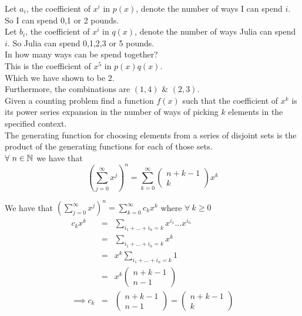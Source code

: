 \documentclass[11pt,a4paper]{article}
\begin{document}
Let $a_i$, the coefficient of $x^i$ in $p(x)$, denote the number of ways I can spend \textsterling$i$. So I can spend 0,1 or 2 pounds.\\
Let $b_i$, the coefficient of $x^i$ in $q(x)$, denote the number of ways Julia can spend \textsterling$i$. So Julia can spend 0,1,2,3 or 5 pounds.\\
In how many ways can be spend  together?\\
This is the coefficient of $x^5$ in $p(x)q(x)$.\\
Which we have shown to be $2$.\\
Furthermore, the combinations are $(1,4)$ \& $(2,3)$.\\

Given a counting problem find a function $f(x)$ such that the coefficient of $x^k$ is its power series expansion in the number of ways of picking $k$ elements in the specified context.\\
\nb The generating function for choosing elements from a series of disjoint sets is the product of the generating functions for each of those sets.\\

$\forall\ n\in\mathbb{N}$ we have that
$$\left(\sum_{j=0}^\infty x^j\right)^n=\sum_{k=0}^\infty\begin{pmatrix}n+k-1\\k\end{pmatrix}x^k$$

We have that $\left(\sum_{j=0}^\infty x^j\right)^n=\sum_{k=0}^\infty c_kx^k$ where $\forall\ k\geq0$
\[\begin{array}{rcl}
c_kx^k&=&\sum\limits_{i_1+\dots+i_n=k}x^{i_1}\dots x^{i_n}\\
&=&\sum\limits_{i_1+\dots+i_n=k}x^k\\
&=&x^k\sum\limits_{i_1+\dots+i_n=k}1\\
&=&x^k\begin{pmatrix}n+k-1\\n-1\end{pmatrix}\\
\implies c_k&=&\begin{pmatrix}n+k-1\\n-1\end{pmatrix}=\begin{pmatrix}n+k-1\\k\end{pmatrix}
\end{array}\]
\end{document}
